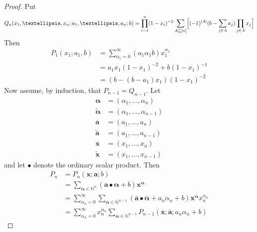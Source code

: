 \documentclass[10pt,a4paper]{amsart}
\newcommand{\Nat}{{\mathbb{N}}}
\newcommand{\tdeg}[1]{\lvert #1 \rvert}
\newcommand{\vek}[1]{\boldsymbol{#1}}
\begin{document}
  \begin{proof}
    Put
    \begin{displaymath}
      Q_n(x_1,\dots,x_n;a_1,\dots,a_n;b) =
      \prod_{i=1}^n(1-x_i)^{-2} \sum_{A \subseteq [n]} \Bigl[  
      (-1)^{\tdeg{A}}(b-\sum_{j \in A} a_j) \prod_{j \in A} x_j \Bigr] 
    \end{displaymath}
    Then
    \begin{displaymath}
      \begin{split}
        P_1(x_1;a_1,b) &= \sum_{\alpha_1=0}^\infty
        (a_1\alpha_1 b) x_1^{\alpha_1} \\
        &= a_1 x_1(1-x_1)^{-2} + b(1-x_1)^{-1} \\
        &= (b-(b-a_1)x_1)(1-x_1)^{-2}
      \end{split}
    \end{displaymath}
    Now assume, by induction, that \(P_{n-1}=Q_{n-1}\). 
    Let 
    \begin{displaymath}
      \begin{split}
        \vek{\alpha} & =(\alpha_1,\dots,\alpha_n) \\
        \widetilde{\vek{\alpha}} &= (\alpha_1,\dots,\alpha_{n-1}) \\
        \vek{a} & = (a_1,\dots,a_n) \\
        \widetilde{\vek{a}} &= (a_1,\dots,a_{n-1})\\
        \vek{x} & = (x_1,\dots,x_n) \\
        \widetilde{\vek{x}} &= (x_1,\dots,x_{n-1})
      \end{split}
    \end{displaymath}
    and let \(\bullet\) denote the ordinary scalar product.
    Then
    \begin{displaymath}
      \begin{split}
        P_n &= P_n(\vek{x};\vek{a};b) \\
        &= \sum_{\vek{\alpha} \in \Nat^n}
        (\vek{a} \bullet \vek{\alpha} +b) \vek{x}^{\vek{\alpha}} \\
        &= \sum_{\alpha_n=0}^\infty \sum_{\overline{\vek{\alpha}} \in
          \Nat^{n-1}}
        (\overline{\vek{a}} \bullet \overline{\vek{\alpha}} + a_n\alpha_n
        +b) \overline{\vek{x}}^{\overline{\vek{\alpha}}} x_n^{\alpha_n} \\
        &=\sum_{\alpha_n=0}^\infty x_n^{\alpha_n}
        \sum_{\overline{\vek{\alpha}} \in \Nat^{n-1}}
        P_{n-1}(\overline{\vek{x}}; \overline{\vek{a}};a_n \alpha_n +b)
      \end{split}

\end{displaymath}
\end{proof}
\end{document}
